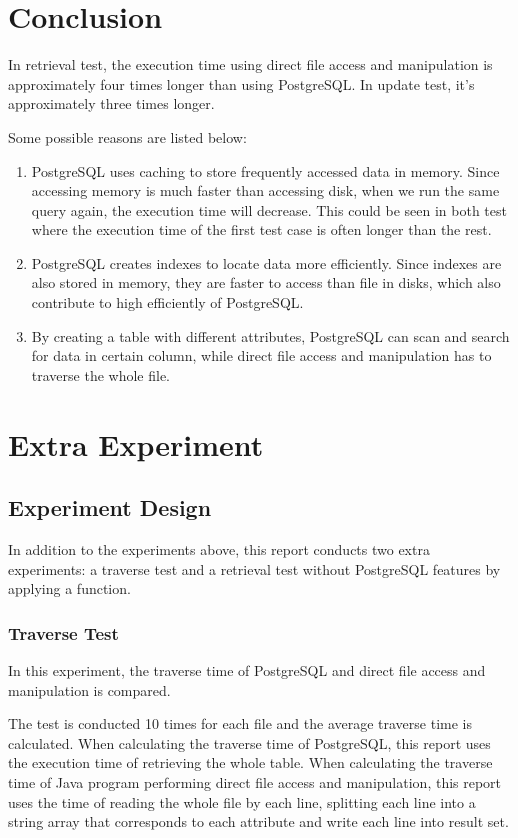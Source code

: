 \documentclass[a4paper,12pt]{article}
\begin{document}
\section{Conclusion}
In retrieval test, the execution time using direct file access and manipulation is approximately four times longer than using PostgreSQL.
In update test, it's approximately three times longer.

Some possible reasons are listed below:

\begin{enumerate}
    \item PostgreSQL uses caching to store frequently accessed data in memory. 
    Since accessing memory is much faster than accessing disk, when we run the same query again, the execution time will decrease.
    This could be seen in both test where the execution time of the first test case is often longer than the rest.
    \item PostgreSQL creates indexes to locate data more efficiently. 
    Since indexes are also stored in memory, they are faster to access than file in disks, which also contribute to high efficiently of PostgreSQL.
    \item By creating a table with different attributes, PostgreSQL can scan and search for data in certain column, while direct file access and manipulation has to traverse the whole file.
\end{enumerate}

\section{Extra Experiment}
\subsection{Experiment Design}
In addition to the experiments above, this report conducts two extra experiments:
a traverse test and a retrieval test without PostgreSQL features by applying a function.

\subsubsection{Traverse Test}
In this experiment, the traverse time of PostgreSQL and direct file access and manipulation is compared.

The test is conducted 10 times for each file and the average traverse time is calculated.
When calculating the traverse time of PostgreSQL, this report uses the execution time of retrieving the whole table.
When calculating the traverse time of Java program performing direct file access and manipulation, this report uses the time of reading the whole file by each line, splitting each line into a string array that corresponds to each attribute and write each line into result set.
\end{document}
